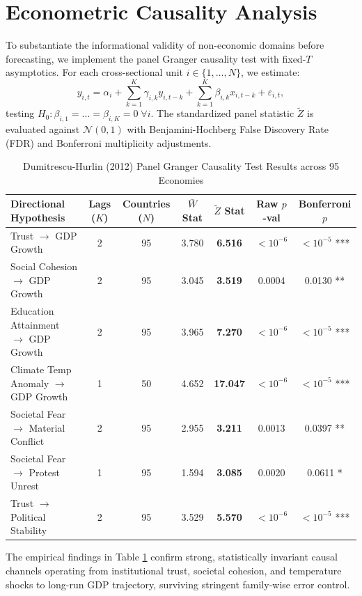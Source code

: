 \documentclass[11pt,a4paper]{article}
\begin{document}
\section{Econometric Causality Analysis}
To substantiate the informational validity of non-economic domains before forecasting, we implement the \citet{dumitrescu2012} panel Granger causality test with fixed-$T$ asymptotics. For each cross-sectional unit $i \in \{1, \dots, N\}$, we estimate:
\begin{equation}
y_{i,t} = \alpha_i + \sum_{k=1}^K \gamma_{i,k} y_{i, t-k} + \sum_{k=1}^K \beta_{i,k} x_{i, t-k} + \varepsilon_{i,t},
\end{equation}
testing $H_0: \beta_{i,1} = \dots = \beta_{i,K} = 0 \; \forall i$. The standardized panel statistic $\tilde{Z}$ is evaluated against $\mathcal{N}(0, 1)$ with Benjamini-Hochberg False Discovery Rate (FDR) and Bonferroni multiplicity adjustments.

\begin{table}[ht]
\centering
\small
\caption{Dumitrescu-Hurlin (2012) Panel Granger Causality Test Results across 95 Economies}
\label{tab:dh_results}
\begin{tabular}{lcccccc}
\toprule
\textbf{Directional Hypothesis} & \textbf{Lags ($K$)} & \textbf{Countries ($N$)} & $\bar{W}$ \textbf{Stat} & $\tilde{Z}$ \textbf{Stat} & \textbf{Raw $p$-val} & \textbf{Bonferroni $p$} \\
\midrule
Trust $\to$ GDP Growth & 2 & 95 & 3.780 & \textbf{6.516} & $< 10^{-6}$ & $< 10^{-5}$ *** \\
Social Cohesion $\to$ GDP Growth & 2 & 95 & 3.045 & \textbf{3.519} & 0.0004 & 0.0130 ** \\
Education Attainment $\to$ GDP Growth & 2 & 95 & 3.965 & \textbf{7.270} & $< 10^{-6}$ & $< 10^{-5}$ *** \\
Climate Temp Anomaly $\to$ GDP Growth & 1 & 50 & 4.652 & \textbf{17.047} & $< 10^{-6}$ & $< 10^{-5}$ *** \\
Societal Fear $\to$ Material Conflict & 2 & 95 & 2.955 & \textbf{3.211} & 0.0013 & 0.0397 ** \\
Societal Fear $\to$ Protest Unrest & 1 & 95 & 1.594 & \textbf{3.085} & 0.0020 & 0.0611 * \\
Trust $\to$ Political Stability & 2 & 95 & 3.529 & \textbf{5.570} & $< 10^{-6}$ & $< 10^{-5}$ *** \\
\bottomrule
\end{tabular}
\end{table}

The empirical findings in Table \ref{tab:dh_results} confirm strong, statistically invariant causal channels operating from institutional trust, societal cohesion, and temperature shocks to long-run GDP trajectory, surviving stringent family-wise error control.
\end{document}
